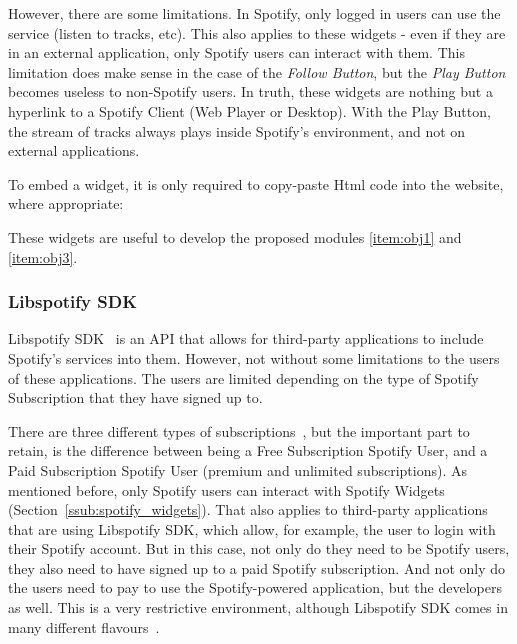         However, there are some limitations.
        In Spotify, only logged in users can use the service (listen to tracks, etc).
        This also applies to these widgets - even if they are in an external application, only Spotify users can interact with them.
        This limitation does make sense in the case of the \emph{Follow Button}, but the \emph{Play Button} becomes useless to non-Spotify users.
        In truth, these widgets are nothing but a hyperlink to a Spotify Client (Web Player or Desktop).
        With the Play Button, the stream of tracks always plays inside Spotify's environment, and not on external applications.

        To embed a widget, it is only required to copy-paste Html code into the website, where appropriate:

        

        These widgets are useful to develop the proposed modules \ref{item:obj1} and \ref{item:obj3}.


      \subsubsection{Libspotify SDK} %
      \label{ssub:libspotify_sdk}

        Libspotify SDK~\cite{libspotifysdk} is an API that allows for third-party applications to include Spotify's services into them.
        However, not without some limitations to the users of these applications.
        The users are limited depending on the type of Spotify Subscription that they have signed up to.

        There are three different types of subscriptions~\cite{spsubscription}, but the important part to retain, is the difference between being a Free Subscription Spotify User, and a Paid Subscription Spotify User (premium and unlimited subscriptions).
        As mentioned before, only Spotify users can interact with Spotify Widgets (Section~\ref{ssub:spotify_widgets}).
        That also applies to third-party applications that are using Libspotify SDK, which allow, for example, the user to login with their Spotify account.
        But in this case, not only do they need to be Spotify users, they also need to have signed up to a paid Spotify subscription.
        And not only do the users need to pay to use the Spotify-powered application, but the developers as well.
        This is a very restrictive environment, although Libspotify SDK comes in many different flavours~\cite{libspotifysdkdown}.

